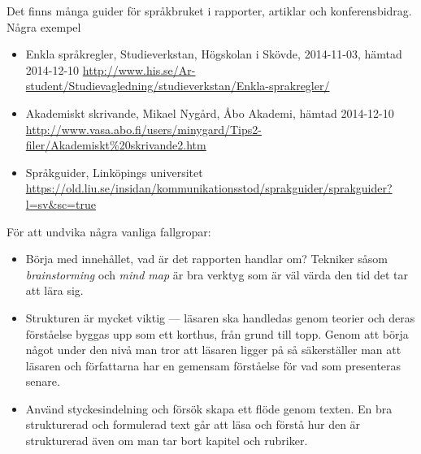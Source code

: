 \documentclass[a4paper,12pt,oneside,final]{extbook}
\begin{document}
Det finns många guider för språkbruket i rapporter, artiklar och konferensbidrag. Några exempel 
\begin{itemize}
\item Enkla språkregler, Studieverkstan, Högskolan i Skövde, 2014-11-03, hämtad 2014-12-10\newline
  \href{http://www.his.se/Ar-student/Studievagledning/studieverkstan/Enkla-sprakregler/}%
       {http://www.his.se/Ar-student/Studievagledning/studieverkstan/Enkla-sprakregler/}
\item Akademiskt skrivande, Mikael Nygård, Åbo Akademi, hämtad 2014-12-10\newline
  \href{http://www.vasa.abo.fi/users/minygard/Tips2-filer/Akademiskt\%20skrivande2.htm}%
       {http://www.vasa.abo.fi/users/minygard/Tips2-filer/Akademiskt\%20skrivande2.htm}
\item Språkguider, Linköpings universitet\newline
  \href{https://old.liu.se/insidan/kommunikationsstod/sprakguider/sprakguider?l=sv\&sc=true}%
       {https://old.liu.se/insidan/kommunikationsstod/sprakguider/sprakguider?l=sv\&sc=true}
\end{itemize}
För att undvika några vanliga fallgropar:
\begin{itemize}
\item Börja med innehållet, vad är det rapporten handlar om? Tekniker
  såsom \emph{brainstorming} och \emph{mind map} är bra verktyg som är
  väl värda den tid det tar att lära sig.
\item Strukturen är mycket viktig --- läsaren ska handledas genom
  teorier och deras förståelse byggas upp som ett korthus, från grund
  till topp. Genom att börja något under den nivå man tror att läsaren
  ligger på så säkerställer man att läsaren och författarna har en
  gemensam förståelse för vad som presenteras senare.
\item Använd styckesindelning och försök skapa ett flöde genom
  texten. En bra strukturerad och formulerad text går att läsa och
  förstå hur den är strukturerad även om man tar bort kapitel och
  rubriker.
\end{itemize}
\end{document}
